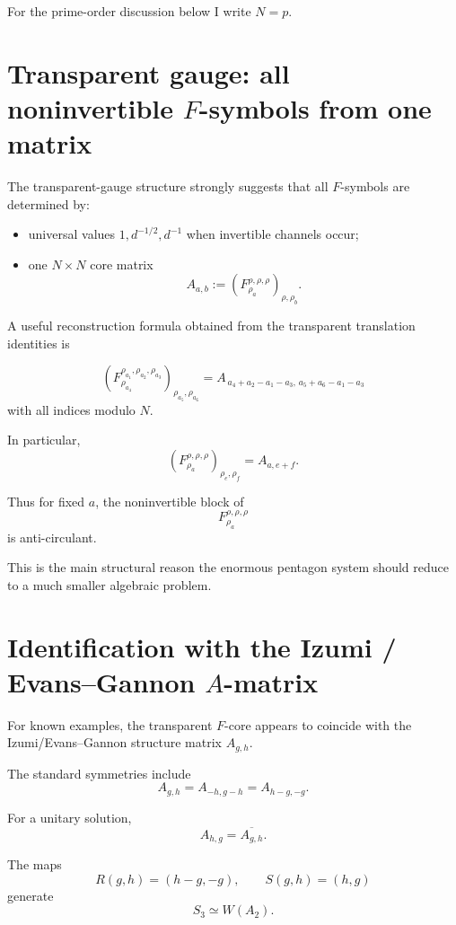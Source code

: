 \documentclass[11pt,reqno]{amsart}
\theoremstyle{plain}
\begin{document}
For the prime-order discussion below I write \(N=p\).

\section{\texorpdfstring{Transparent gauge: all noninvertible \(F\)-symbols from one matrix}{Transparent gauge: all noninvertible F-symbols from one matrix}}\label{sec:2}

The transparent-gauge structure strongly suggests that all \(F\)-symbols are determined by:

\begin{itemize}
\item universal values \(1,d^{-1/2},d^{-1}\) when invertible channels occur;
\item one \(N\times N\) core matrix
\[
A_{a,b}
:=
\left(F^{\rho,\rho,\rho}_{\rho_a}\right)_{\rho,\rho_b}.
\]
\end{itemize}

A useful reconstruction formula obtained from the transparent translation identities is

\[
\boxed{
\left(
F^{\rho_{a_1},\rho_{a_2},\rho_{a_3}}_{\rho_{a_4}}
\right)_{\rho_{a_5},\rho_{a_6}}
=
A_{\,
a_4+a_2-a_1-a_3,\,
a_5+a_6-a_1-a_3
}
}
\]
with all indices modulo \(N\).

In particular,
\[
\boxed{
\left(F^{\rho,\rho,\rho}_{\rho_a}\right)_{\rho_e,\rho_f}
=
A_{a,e+f}.
}
\]

Thus for fixed \(a\), the noninvertible block of
\[
F^{\rho,\rho,\rho}_{\rho_a}
\]
is anti-circulant.

This is the main structural reason the enormous pentagon system should reduce to a much smaller algebraic problem.

\section{\texorpdfstring{Identification with the Izumi / Evans--Gannon \(A\)-matrix}{Identification with the Izumi / Evans-Gannon A-matrix}}\label{sec:3}

For known examples, the transparent \(F\)-core appears to coincide with the Izumi/Evans--Gannon structure matrix \(A_{g,h}\).

The standard symmetries include
\[
A_{g,h}
=
A_{-h,g-h}
=
A_{h-g,-g}.
\]

For a unitary solution,
\[
A_{h,g}=\overline{A_{g,h}}.
\]

The maps
\[
R(g,h)=(h-g,-g),
\qquad
S(g,h)=(h,g)
\]
generate
\[
S_3\simeq W(A_2).
\]
\end{document}
